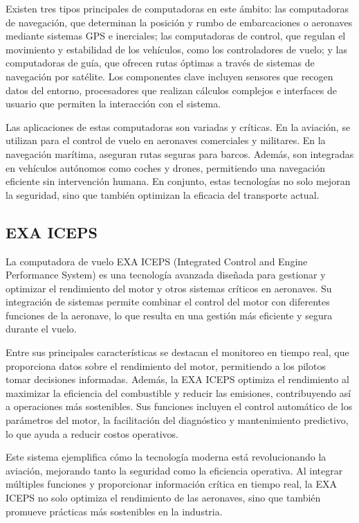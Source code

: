 Existen tres tipos principales de computadoras en este ámbito: las computadoras de navegación, que determinan la posición y rumbo de embarcaciones o aeronaves mediante sistemas GPS e inerciales; las computadoras de control, que regulan el movimiento y estabilidad de los vehículos, como los controladores de vuelo; y las computadoras de guía, que ofrecen rutas óptimas a través de sistemas de navegación por satélite. Los componentes clave incluyen sensores que recogen datos del entorno, procesadores que realizan cálculos complejos e interfaces de usuario que permiten la interacción con el sistema.

Las aplicaciones de estas computadoras son variadas y críticas. En la aviación, se utilizan para el control de vuelo en aeronaves comerciales y militares. En la navegación marítima, aseguran rutas seguras para barcos. Además, son integradas en vehículos autónomos como coches y drones, permitiendo una navegación eficiente sin intervención humana. En conjunto, estas tecnologías no solo mejoran la seguridad, sino que también optimizan la eficacia del transporte actual.

\subsection{EXA ICEPS}\label{sec:exaiceps}
La computadora de vuelo EXA ICEPS (Integrated Control and Engine Performance System) es una tecnología avanzada diseñada para gestionar y optimizar el rendimiento del motor y otros sistemas críticos en aeronaves. Su integración de sistemas permite combinar el control del motor con diferentes funciones de la aeronave, lo que resulta en una gestión más eficiente y segura durante el vuelo.

Entre sus principales características se destacan el monitoreo en tiempo real, que proporciona datos sobre el rendimiento del motor, permitiendo a los pilotos tomar decisiones informadas. Además, la EXA ICEPS optimiza el rendimiento al maximizar la eficiencia del combustible y reducir las emisiones, contribuyendo así a operaciones más sostenibles. Sus funciones incluyen el control automático de los parámetros del motor, la facilitación del diagnóstico y mantenimiento predictivo, lo que ayuda a reducir costos operativos.

Este sistema ejemplifica cómo la tecnología moderna está revolucionando la aviación, mejorando tanto la seguridad como la eficiencia operativa. Al integrar múltiples funciones y proporcionar información crítica en tiempo real, la EXA ICEPS no solo optimiza el rendimiento de las aeronaves, sino que también promueve prácticas más sostenibles en la industria.


